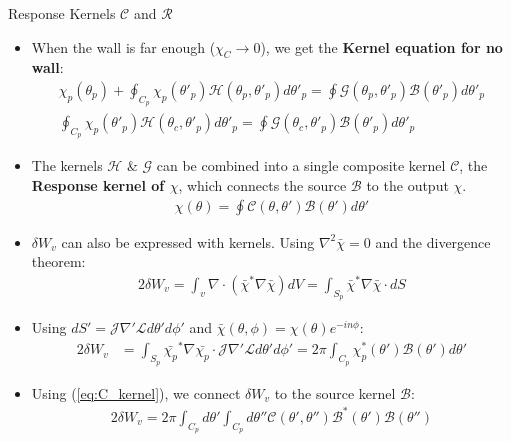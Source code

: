 \documentclass[8pt]{beamer}
\begin{document}
\begin{frame}{\color{white} Response Kernels $\mathcal{C}$ and $\mathcal{R}$}
\begin{itemize}
    \item When the wall is far enough ($\chi_C \xrightarrow{} 0$), we get the \textbf{Kernel equation for no wall}:
    \begin{align}
         \chi_p(\theta_p) +  \oint_{C_p} \chi_p(\theta'_p) \mathcal{H}(\theta_p, \theta'_p) d\theta'_p 
         = \oint \mathcal{G}(\theta_p, \theta'_p) \mathcal{B}(\theta'_p) d\theta'_p \\
         \oint_{C_p} \chi_p(\theta'_p) \mathcal{H}(\theta_c, \theta'_p) d\theta'_p 
         = \oint \mathcal{G}(\theta_c, \theta'_p) \mathcal{B}(\theta'_p) d\theta'_p
    \end{align}
    \item The kernels $\mathcal{H}$ \& $\mathcal{G}$ can be combined into a single composite kernel $\mathcal{C}$, the \textbf{Response kernel of $\chi$}, which connects the source $\mathcal{B}$ to the output $\chi$.
    \begin{align}
         \chi(\theta) = \oint \mathcal{C}(\theta,\theta') \mathcal{B}(\theta') d\theta' \label{eq:C_kernel}
    \end{align}
    \item $\delta W_v$ can also be expressed with kernels. Using $\nabla^2 \bar{\chi} = 0$ and the divergence theorem:
    \begin{align}
         2\delta W_v = \int_v \nabla \cdot ( \bar{\chi}^* \nabla \bar{\chi}) dV = \int_{S_p} \bar{\chi}^* \nabla \bar{\chi} \cdot dS
    \end{align}
    \item Using $dS' = \mathcal{J} \nabla'\mathcal{L} d \theta' d\phi'$ and $\bar{\chi}(\theta,\phi) = \chi(\theta) e^{-in\phi}$:
    \begin{align}
         2\delta W_v &= \int_{S_p} \bar{\chi_p}^* \nabla \bar{\chi_p} \cdot \mathcal{J} \nabla'\mathcal{L} d \theta' d\phi' = 2\pi \int_{C_p} \chi^*_p(\theta') \mathcal{B}(\theta')d\theta'
    \end{align}
    \item Using (\ref{eq:C_kernel}), we connect $\delta W_v$ to the source kernel $\mathcal{B}$:
    \begin{align}
         2\delta W_v = 2\pi \int_{C_p} d\theta' \int_{C_p} d\theta'' \mathcal{C}(\theta',\theta'') \mathcal{B}^*(\theta') \mathcal{B}(\theta'') \label{deltaW=CB}  
    \end{align}

\end{itemize}
\end{frame}
\end{document}
